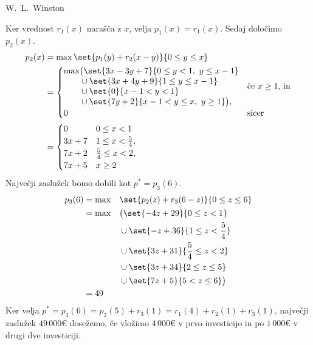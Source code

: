 \begin{naloga}{W.~L.~Winston}{\cite[\S 18, Example~5]{w}}
\begin{odgovor}
Ker vrednost $r_1(x)$ narašča z $x$, velja $p_1(x) = r_1(x)$.
Sedaj določimo $p_2(x)$.
\begin{align*}
p_2(x) &= \max\set{p_1(y) + r_2(x-y)}{0 \le y \le x} \\
&= \begin{cases}
\begin{aligned}
\max&\big(\set{3x - 3y + 7}{0 \le y < 1, \ y \le x-1} \\
&\cup \set{3x + 4y + 9}{1 \le y \le x-1} \\
&\cup \set{0}{x-1 < y < 1} \\
&\cup \set{7y+2}{x-1 < y \le x, \ y \ge 1}\big),
\end{aligned}
& \text{če $x \ge 1$, in} \\
0 & \text{sicer}
\end{cases} \\
&= \begin{cases}
0 & 0 \le x < 1 \\
3x+7 & 1 \le x < {5 \over 4}, \\
7x+2 & {5 \over 4} \le x < 2, \\
7x+5 & x \ge 2
\end{cases}
\end{align*}
Največji zaslužek bomo dobili kot $p^* = p_3(6)$.
\begin{alignat*}{2}
p_3(6) &= \max&&{} \set{p_2(z) + r_3(6-z)}{0 \le z \le 6} \\
&= \max&&{} \big(\set{-4z+29}{0 \le z < 1} \\
&&&\cup \set{-z+36}{1 \le z < {5 \over 4}} \\
&&&\cup \set{3z+31}{{5 \over 4} \le z < 2} \\
&&&\cup \set{3z+34}{2 \le z \le 5} \\
&&&\cup \set{7z+5}{5 < z \le 6}\big) \\
&= 49
\end{alignat*}
Ker velja $p^* = p_3(6) = p_2(5) + r_3(1) = r_1(4) + r_2(1) + r_3(1)$,
največji zaslužek $49\,000 €$ dosežemo,
če vložimo $4\,000 €$ v prvo investicijo
in po $1\,000 €$ v drugi dve investiciji.
\end{odgovor}
\end{naloga}
